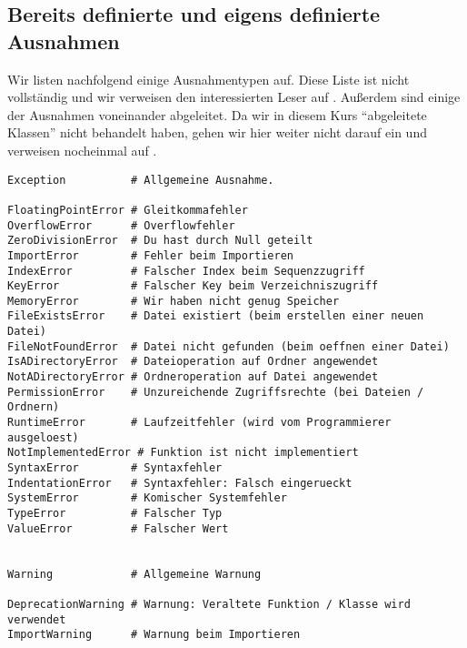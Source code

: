 \subsection{Bereits definierte und eigens definierte Ausnahmen}
\label{section:ausnahmen:definierte_und_eigene_ausnahmen}

Wir listen nachfolgend einige Ausnahmentypen auf.
Diese Liste ist nicht vollständig und wir verweisen den interessierten Leser auf \cite[Library: Exceptions]{Python3}.
Außerdem sind einige der Ausnahmen voneinander abgeleitet.
Da wir in diesem Kurs ``abgeleitete Klassen'' nicht behandelt haben, gehen wir hier weiter nicht darauf ein und verweisen nocheinmal auf \cite[Library: Exceptions]{Python3}.
\begin{lstlisting}
Exception          # Allgemeine Ausnahme.

FloatingPointError # Gleitkommafehler
OverflowError      # Overflowfehler
ZeroDivisionError  # Du hast durch Null geteilt
ImportError        # Fehler beim Importieren
IndexError         # Falscher Index beim Sequenzzugriff
KeyError           # Falscher Key beim Verzeichniszugriff
MemoryError        # Wir haben nicht genug Speicher
FileExistsError    # Datei existiert (beim erstellen einer neuen Datei)
FileNotFoundError  # Datei nicht gefunden (beim oeffnen einer Datei)
IsADirectoryError  # Dateioperation auf Ordner angewendet
NotADirectoryError # Ordneroperation auf Datei angewendet
PermissionError    # Unzureichende Zugriffsrechte (bei Dateien / Ordnern)
RuntimeError       # Laufzeitfehler (wird vom Programmierer ausgeloest)
NotImplementedError # Funktion ist nicht implementiert
SyntaxError        # Syntaxfehler
IndentationError   # Syntaxfehler: Falsch eingerueckt
SystemError        # Komischer Systemfehler
TypeError          # Falscher Typ
ValueError         # Falscher Wert


Warning            # Allgemeine Warnung

DeprecationWarning # Warnung: Veraltete Funktion / Klasse wird verwendet
ImportWarning      # Warnung beim Importieren
\end{lstlisting}

